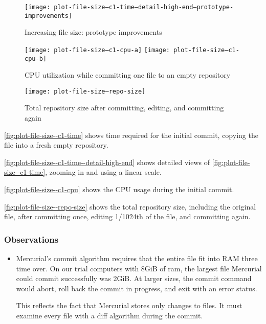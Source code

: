 \begin{figure}[]
  \caption{Increasing file size: prototype improvements}
  \label{fig:plot-file-size--c1-time--prototype-improvements}
  \centering
    \texttt{[image: plot-file-size--c1-time--detail-high-end--prototype-improvements]}
\end{figure}

\begin{figure}[]
  \caption{CPU utilization while committing one file to an empty repository}
  \label{fig:plot-file-size--c1-cpu}
  \centering
    \texttt{[image: plot-file-size--c1-cpu-a]}
    \texttt{[image: plot-file-size--c1-cpu-b]}
\end{figure}

\begin{figure}[]
  \caption{Total repository size after committing, editing, and committing again}
  \label{fig:plot-file-size--repo-size}
  \centering
    \texttt{[image: plot-file-size--repo-size]}
\end{figure}

\autoref{fig:plot-file-size--c1-time} shows time required for
the initial commit, copying the file into a fresh empty repository.

\autoref{fig:plot-file-size--c1-time--detail-high-end} shows
detailed views of \autoref{fig:plot-file-size--c1-time}, zooming
in and using a linear scale.

\autoref{fig:plot-file-size--c1-cpu} shows the
CPU usage during the initial commit.

\autoref{fig:plot-file-size--repo-size} shows the total
repository size, including the original file, after committing once, editing
1/1024th of the file, and committing again.

\iffalse

\subsubsection{Observations}

\begin{itemize}

  \item Mercurial's commit algorithm requires that the entire file fit into RAM
    three time over. On our trial computers with 8GiB of ram, the largest file
    Mercurial could commit successfully was 2GiB. At larger sizes, the commit
    command would abort, roll back the commit in progress, and exit with an
    error status.

    This reflects the fact that Mercurial stores only changes to files. It must
    examine every file with a diff algorithm during the commit.

\end{itemize}


